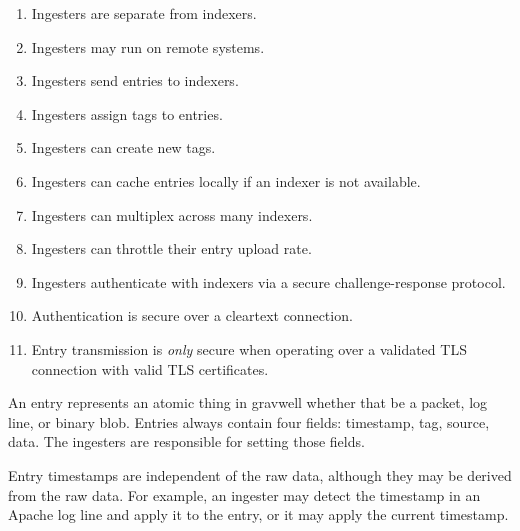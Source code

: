 \begin{enumerate}
\tightlist
\item
  {Ingesters are separate from indexers.}
\item
  {Ingesters may run on remote systems.}
\item
  {Ingesters send entries to indexers.}
\item
  {Ingesters assign tags to entries.}
\item
  {Ingesters can create new tags.}
\item
  {Ingesters can cache entries locally if an indexer is not available.}
\item
  {Ingesters can multiplex across many indexers.}
\item
  {Ingesters can throttle their entry upload rate.}
\item
  {Ingesters authenticate with indexers via a secure challenge-response protocol.}
\item
  {Authentication is secure over a cleartext connection.}
\item
  {Entry transmission is \emph{only} secure when operating over a validated TLS
  connection with valid TLS certificates.}
\end{enumerate}

An entry represents an atomic thing in gravwell whether that be a
packet, log line, or binary blob. Entries always contain four fields:
timestamp, tag, source, data. The ingesters are responsible for setting
those fields.

Entry timestamps are independent of the raw data, although they may be
derived from the raw data. For example, an ingester may detect the
timestamp in an Apache log line and apply it to the entry, or it may
apply the current timestamp.

